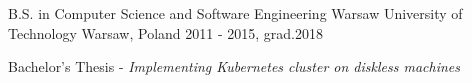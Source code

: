 

\begin{cventries}

  \cventry
  {B.S. in Computer Science and Software Engineering} %
  {Warsaw University of Technology} %
  {Warsaw, Poland} %
  {2011 - 2015, grad.2018} %
  {
    \begin{cvitems} %
      \item {Bachelor's Thesis - \em{Implementing Kubernetes cluster on diskless machines}}
    \end{cvitems}
  }

\end{cventries}
